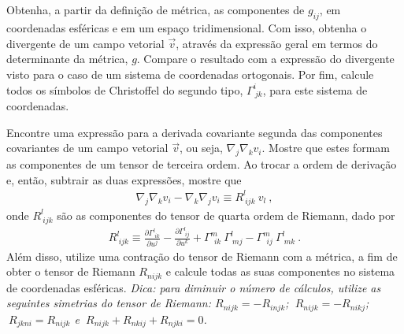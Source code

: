 \documentclass[a4paper,12pt]{article}
\begin{document}

\newpage



{}\\
\\
\\
\\

%

\indent \par Obtenha, a partir da definição de métrica, as componentes de $g_{ij}$, em coordenadas esféricas e em um espaço tridimensional. Com isso, obtenha o divergente de um campo vetorial $\vec{v}$, através da expressão geral em termos do determinante da métrica, $g$. Compare o resultado com a expressão do divergente visto para o caso de um sistema de coordenadas ortogonais. Por fim, calcule todos os símbolos de Christoffel do segundo tipo, $\Gamma^{i}_{~jk}$, para este sistema de coordenadas.\\
%


\indent \par Encontre uma expressão para a derivada covariante segunda das componentes covariantes de um campo vetorial $\vec{v}$, ou seja, $\nabla_{j} \nabla_{k} v_{i}$. Mostre que estes formam as componentes de um tensor de terceira ordem. Ao trocar a ordem de derivação e, então, subtrair as duas expressões, mostre que 
%
\begin{eqnarray}
  \nonumber
  \nabla_{j}\nabla_{k} v_{i} - \nabla_{k}\nabla_{j} v_{i} \equiv R^{l}_{~ijk} ~v_{l} ~,
 \end{eqnarray}
%
\noindent onde $R^{l}_{~ijk}$ são as componentes do tensor de quarta ordem de Riemann, dado por
%
\begin{eqnarray}
  \nonumber
  R^{l}_{~ijk}\equiv \frac{\partial \Gamma^{l}_{~ik}}{\partial u^{j}} - \frac{\partial \Gamma^{l}_{~ij}}{\partial u^{k}} + \Gamma^{m}_{{~~ik}} ~\Gamma^{l}_{{~mj}} - \Gamma^{m}_{{~~ij}} ~\Gamma^{l}_{{~mk}} ~.
 \end{eqnarray}
%
\noindent Além disso, utilize uma contração do tensor de Riemann com a métrica, a fim de obter o tensor de Riemann $R_{nijk}$ e calcule todas as suas componentes no sistema de coordenadas esféricas. {\it{Dica: para diminuir o número de cálculos, utilize as seguintes simetrias do tensor de Riemann: $R_{nijk}=-R_{injk}$; $~R_{nijk}=-R_{nikj}$; $~R_{jkni}=R_{nijk}$ e $~R_{nijk}+R_{nkij}+R_{njki}=0$}.}\\
\end{document}
